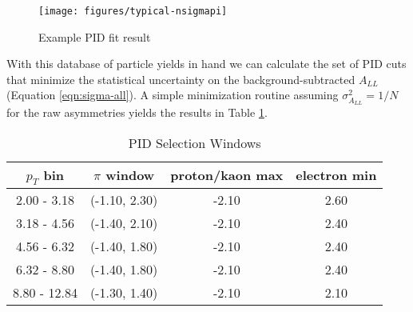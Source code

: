 \begin{figure}
  \begin{center}
    \texttt{[image: figures/typical-nsigmapi]}    
  \end{center}
  \caption{Example PID fit result}
  \label{fig:typical-nsigmapi}
\end{figure}

With this database of particle yields in hand we can calculate the set of PID
cuts that minimize the statistical uncertainty on the background-subtracted
$A_{LL}$ (Equation \ref{eqn:sigma-all}). A simple minimization routine
assuming $\sigma_{A_{LL}}^{2} = 1/N$ for the raw asymmetries yields the
results in Table \ref{tbl:pid-selection-windows}.

\begin{table}
    \begin{center}
        \begin{tabular}{c|ccc}
        \hline
        $p_{T}$ bin & $\pi$ window & proton/kaon max & electron min\\
        \hline
        \hline
        2.00 - 3.18 & (-1.10, 2.30) & -2.10 & 2.60\\
        3.18 - 4.56 & (-1.40, 2.10) & -2.10 & 2.40\\
        4.56 - 6.32 & (-1.40, 1.80) & -2.10 & 2.40\\
        6.32 - 8.80 & (-1.40, 1.80) & -2.10 & 2.40\\
        8.80 - 12.84 & (-1.30, 1.40) & -2.10 & 2.10\\
    \hline
    \end{tabular}
    \end{center}
    \caption{PID Selection Windows}
    \label{tbl:pid-selection-windows}
\end{table}
